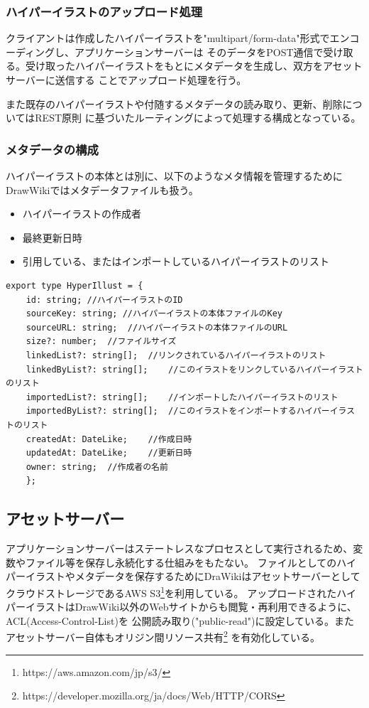 \subsubsection{ハイパーイラストのアップロード処理}
クライアントは作成したハイパーイラストを"multipart/form-data"形式でエンコーディングし、アプリケーションサーバーは
そのデータをPOST通信で受け取る。受け取ったハイパーイラストをもとにメタデータを生成し、双方をアセットサーバーに送信する
ことでアップロード処理を行う。

また既存のハイパーイラストや付随するメタデータの読み取り、更新、削除についてはREST原則\cite{Fielding2000ArchitecturalSA}
に基づいたルーティングによって処理する構成となっている。

\subsubsection{メタデータの構成}
ハイパーイラストの本体とは別に、以下のようなメタ情報を管理するためにDrawWikiではメタデータファイルも扱う。
\begin{itemize}
    \item ハイパーイラストの作成者
    \item 最終更新日時
    \item 引用している、またはインポートしているハイパーイラストのリスト
\end{itemize}

\begin{lstlisting}[caption=メタデータの概要, label=metadatajson]
    export type HyperIllust = {
    id: string; //ハイパーイラストのID
    sourceKey: string; //ハイパーイラストの本体ファイルのKey
    sourceURL: string;  //ハイパーイラストの本体ファイルのURL
    size?: number;  //ファイルサイズ
    linkedList?: string[];  //リンクされているハイパーイラストのリスト
    linkedByList?: string[];    //このイラストをリンクしているハイパーイラストのリスト
    importedList?: string[];    //インポートしたハイパーイラストのリスト
    importedByList?: string[];  //このイラストをインポートするハイパーイラストのリスト
    createdAt: DateLike;    //作成日時
    updatedAt: DateLike;    //更新日時
    owner: string;  //作成者の名前
    };
\end{lstlisting}

\subsection{アセットサーバー}
アプリケーションサーバーはステートレスなプロセスとして実行されるため、変数やファイル等を保存し永続化する仕組みをもたない。
ファイルとしてのハイパーイラストやメタデータを保存するためにDraWikiはアセットサーバーとして
クラウドストレージであるAWS S3\footnote{https://aws.amazon.com/jp/s3/}を利用している。
アップロードされたハイパーイラストはDrawWiki以外のWebサイトからも閲覧・再利用できるように、ACL(Access-Control-List)を
公開読み取り("public-read")に設定している。またアセットサーバー自体もオリジン間リソース共有\footnote{https://developer.mozilla.org/ja/docs/Web/HTTP/CORS}
を有効化している。
